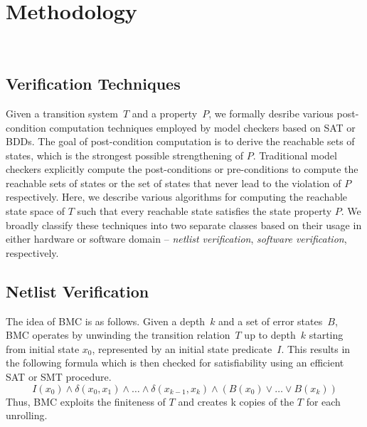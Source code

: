 \section{Methodology}~\label{methodology}
\subsection{Verification Techniques}

Given a transition system~$T$ and a property~$P$, we formally desribe 
various post-condition computation techniques employed by
model checkers based on SAT or BDDs.  The goal of post-condition computation
is to derive the reachable sets of states, which is the strongest possible
strengthening of $P$.  Traditional model checkers explicitly compute the
post-conditions or pre-conditions to compute the reachable sets of states or
the set of states that never lead to the violation of $P$ respectively. 
Here, we describe various algorithms for computing the reachable state space
of $T$ such that every reachable state satisfies the state property $P$. We 
broadly classify these techniques into two separate classes based on their 
usage in either hardware or software domain -- \emph{netlist verification}, 
\emph{software verification}, respectively. 

\subsection{Netlist Verification}
%
%
The idea of BMC is as follows. 
Given a depth~$k$ and a set of error states~$B$, BMC operates
by unwinding the transition relation~$T$ up to depth~$k$ starting from
initial state $x_0$, represented by an initial state predicate~$I$.
This results in the following formula which is then checked for
satisfiability using an efficient SAT or SMT procedure.
%
\[ I(x_0) \wedge \delta(x_0, x_1) \wedge \ldots 
   \wedge \delta(x_{k-1}, x_k) \wedge (B(x_0) \vee \ldots \vee B(x_k)) \]
%
Thus, BMC exploits the finiteness of $T$ and creates k copies of the
$T$ for each unrolling.

